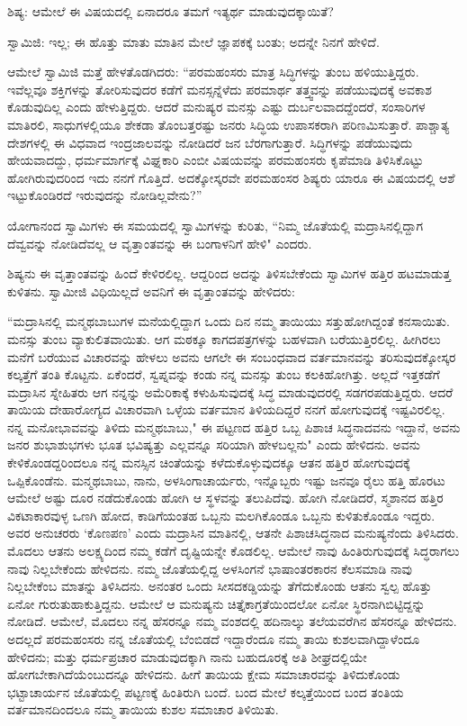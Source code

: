ಶಿಷ್ಯ: ಆಮೇಲೆ ಈ ವಿಷಯದಲ್ಲಿ ಏನಾದರೂ ತಮಗೆ ಇತ್ಯರ್ಥ ಮಾಡುವುದಕ್ಕಾಯಿತೆ?

ಸ್ವಾಮಿಜಿ: ಇಲ್ಲ; ಈ ಹೊತ್ತು ಮಾತು ಮಾತಿನ ಮೇಲೆ ಜ್ಞಾಪಕಕ್ಕೆ ಬಂತು; ಅದನ್ನೇ ನಿನಗೆ ಹೇಳಿದೆ.

ಆಮೇಲೆ ಸ್ವಾಮಿಜಿ ಮತ್ತೆ ಹೇಳತೊಡಗಿದರು: “ಪರಮಹಂಸರು ಮಾತ್ರ ಸಿದ್ಧಿಗಳನ್ನು ತುಂಬ ಹಳಿಯುತ್ತಿದ್ದರು. ಇವೆಲ್ಲವೂ ಶಕ್ತಿಗಳನ್ನು ತೋರಿಸುವುದರ ಕಡೆಗೆ ಮನಸ್ಸನ್ನೆಳೆದು ಪರಮಾರ್ಥ ತತ್ತ್ವವನ್ನು ಪಡೆಯುವುದಕ್ಕೆ ಅವಕಾಶ ಕೊಡುವುದಿಲ್ಲ ಎಂದು ಹೇಳುತ್ತಿದ್ದರು. ಆದರೆ ಮನುಷ್ಯರ ಮನಸ್ಸು ಎಷ್ಟು ದುರ್ಬಲವಾದದ್ದೆಂದರೆ, ಸಂಸಾರಿಗಳ ಮಾತಿರಲಿ, ಸಾಧುಗಳಲ್ಲಿಯೂ ಶೇಕಡಾ ತೊಂಬತ್ತರಷ್ಟು ಜನರು ಸಿದ್ಧಿಯ ಉಪಾಸಕರಾಗಿ ಪರಿಣಮಿಸುತ್ತಾರೆ. ಪಾಶ್ಚಾತ್ಯ ದೇಶಗಳಲ್ಲಿ ಈ ವಿಧವಾದ ಇಂದ್ರಜಾಲವನ್ನು ನೋಡಿದರೆ ಜನ ಬೆರಗಾಗುತ್ತಾರೆ. ಸಿದ್ಧಿಗಳನ್ನು ಪಡೆಯುವುದು ಹೇಯವಾದದ್ದು, ಧರ್ಮಮಾರ್ಗಕ್ಕೆ ವಿಘ್ನಕಾರಿ ಎಂಬೀ ವಿಷಯವನ್ನು ಪರಮಹಂಸರು ಕೃಪೆಮಾಡಿ ತಿಳಿಸಿಕೊಟ್ಟು ಹೋಗಿರುವುದರಿಂದ ಇದು ನನಗೆ ಗೊತ್ತಿದೆ. ಅದಕ್ಕೋಸ್ಕರವೇ ಪರಮಹಂಸರ ಶಿಷ್ಯರು ಯಾರೂ ಈ ವಿಷಯದಲ್ಲಿ ಆಶೆ ಇಟ್ಟುಕೊಂಡಿರದೆ ಇರುವುದನ್ನು ನೋಡಿಲ್ಲವೇನು?”

ಯೋಗಾನಂದ ಸ್ವಾಮಿಗಳು ಈ ಸಮಯದಲ್ಲಿ ಸ್ವಾಮಿಗಳನ್ನು ಕುರಿತು, “ನಿಮ್ಮ ಜೊತೆಯಲ್ಲಿ ಮದ್ರಾಸಿನಲ್ಲಿದ್ದಾಗ ದೆವ್ವವನ್ನು ನೋಡಿದೆವಲ್ಲ ಆ ವೃತ್ತಾಂತವನ್ನು ಈ ಬಂಗಾಳನಿಗೆ ಹೇಳಿ" ಎಂದರು.

ಶಿಷ್ಯನು ಈ ವೃತ್ತಾಂತವನ್ನು ಹಿಂದೆ ಕೇಳಿರಲಿಲ್ಲ. ಆದ್ದರಿಂದ ಅದನ್ನು ತಿಳಿಸಬೇಕೆಂದು ಸ್ವಾಮಿಗಳ ಹತ್ತಿರ ಹಟಮಾಡುತ್ತ ಕುಳಿತನು. ಸ್ವಾಮೀಜಿ ವಿಧಿಯಿಲ್ಲದೆ ಅವನಿಗೆ ಈ ವೃತ್ತಾಂತವನ್ನು ಹೇಳಿದರು:

“ಮದ್ರಾಸಿನಲ್ಲಿ ಮನ್ಮಥಬಾಬುಗಳ ಮನೆಯಲ್ಲಿದ್ದಾಗ ಒಂದು ದಿನ ನಮ್ಮ ತಾಯಿಯು ಸತ್ತುಹೋಗಿದ್ದಂತೆ ಕನಸಾಯಿತು. ಮನಸ್ಸು ತುಂಬ ವ್ಯಾಕುಲಿತವಾಯಿತು. ಆಗ ಮಠಕ್ಕೂ ಕಾಗದಪತ್ರಗಳನ್ನು ಬಹಳವಾಗಿ ಬರೆಯುತ್ತಿರಲಿಲ್ಲ. ಹೀಗಿರಲು ಮನೆಗೆ ಬರೆಯುವ ವಿಚಾರವನ್ನು ಹೇಳಲು ಅವನು ಆಗಲೇ ಈ ಸಂಬಂಧವಾದ ವರ್ತಮಾನವನ್ನು ತರಿಸುವುದಕ್ಕೋಸ್ಕರ ಕಲ್ಕತ್ತೆಗೆ ತಂತಿ ಕೊಟ್ಟನು. ಏಕೆಂದರೆ, ಸ್ವಪ್ನವನ್ನು ಕಂಡು ನನ್ನ ಮನಸ್ಸು ತುಂಬ ಕಲಕಿಹೋಗಿತ್ತು. ಅಲ್ಲದೆ ಇತ್ತಕಡೆಗೆ ಮದ್ರಾಸಿನ ಸ್ನೇಹಿತರು ಆಗ ನನ್ನನ್ನು ಅಮೆರಿಕಾಕ್ಕೆ ಕಳುಹಿಸುವುದಕ್ಕೆ ಸಿದ್ಧ ಮಾಡುವುದರಲ್ಲಿ ಸಡಗರಪಡುತ್ತಿದ್ದರು. ಆದರೆ ತಾಯಿಯ ದೇಹಾರೋಗ್ಯದ ವಿಚಾರವಾಗಿ ಒಳ್ಳೆಯ ವರ್ತಮಾನ ತಿಳಿಯದಿದ್ದರೆ ನನಗೆ ಹೋಗುವುದಕ್ಕೆ ಇಷ್ಟವಿರಲಿಲ್ಲ. ನನ್ನ ಮನೋಭಾವವನ್ನು ತಿಳಿದು ಮನ್ಮಥಬಾಬು," ಈ ಪಟ್ಟಣದ ಹತ್ತಿರ ಒಬ್ಬ ಪಿಶಾಚ ಸಿದ್ಧನಾದವನು ಇದ್ದಾನೆ, ಅವನು ಜನರ ಶುಭಾಶುಭಗಳು ಭೂತ ಭವಿಷ್ಯತ್ತು ಎಲ್ಲವನ್ನೂ ಸರಿಯಾಗಿ ಹೇಳಬಲ್ಲನು" ಎಂದು ಹೇಳಿದನು. ಅವನು ಕೇಳಿಕೊಂಡದ್ದರಿಂದಲೂ ನನ್ನ ಮನಸ್ಸಿನ ಚಿಂತೆಯನ್ನು ಕಳೆದುಕೊಳ್ಳುವುದಕ್ಕೂ ಆತನ ಹತ್ತಿರ ಹೋಗುವುದಕ್ಕೆ ಒಪ್ಪಿಕೊಂಡೆನು. ಮನ್ಮಥಬಾಬು, ನಾನು, ಅಳಸಿಂಗಾಚಾರ್ಯರು, ಇನ್ನೊಬ್ಬರು ಇಷ್ಟು ಜನವೂ ರೈಲು ಹತ್ತಿ ಹೊರಟು ಆಮೇಲೆ ಅಷ್ಟು ದೂರ ನಡೆದುಕೊಂಡು ಹೋಗಿ ಆ ಸ್ಥಳವನ್ನು ತಲುಪಿದೆವು. ಹೋಗಿ ನೋಡಿದರೆ, ಸ್ಮಶಾನದ ಹತ್ತಿರ ವಿಕಟಾಕಾರವುಳ್ಳ ಒಣಗಿ ಹೋದ, ಕಾಡಿಗೆಯಂತಹ ಒಬ್ಬನು ಮಲಗಿಕೊಂಡೂ ಒಬ್ಬನು ಕುಳಿತುಕೊಂಡೂ ಇದ್ದರು. ಅವರ ಅನುಚರರು ‘ಕೊಣಪಣ’ ಎಂದು ಮದ್ರಾಸಿನ ಮಾತಿನಲ್ಲಿ, ಆತನೇ ಪಿಶಾಚಸಿದ್ಧನಾದ ಮನುಷ್ಯನೆಂದು ತಿಳಿಸಿದರು. ಮೊದಲು ಆತನು ಅಲಕ್ಷ್ಯದಿಂದ ನಮ್ಮ ಕಡೆಗೆ ದೃಷ್ಟಿಯನ್ನೇ ಕೊಡಲಿಲ್ಲ. ಆಮೇಲೆ ನಾವು ಹಿಂತಿರುಗುವುದಕ್ಕೆ ಸಿದ್ಧರಾಗಲು ನಾವು ನಿಲ್ಲಬೇಕೆಂದು ಹೇಳಿದನು. ನಮ್ಮ ಜೊತೆಯಲ್ಲಿದ್ದ ಅಳಸಿಂಗನೆ ಭಾಷಾಂತರಕಾರನ ಕೆಲಸಮಾಡಿ ನಾವು ನಿಲ್ಲಬೇಕೆಂಬ ಮಾತನ್ನು ತಿಳಿಸಿದನು. ಅನಂತರ ಒಂದು ಸೀಸದಕಡ್ಡಿಯನ್ನು ತೆಗೆದುಕೊಂಡು ಆತನು ಸ್ವಲ್ಪ ಹೊತ್ತು ಏನೋ ಗುರುತುಹಾಕುತ್ತಿದ್ದನು. ಆಮೇಲೆ ಆ ಮನುಷ್ಯನು ಚಿತ್ತೈಕಾಗ್ರತೆಯಿಂದಲೋ ಏನೋ ಸ್ಥಿರನಾಗಿಬಿಟ್ಟಿದ್ದನ್ನು ನೋಡಿದೆ. ಆಮೇಲೆ, ಮೊದಲು ನನ್ನ ಹೆಸರನ್ನೂ ನಮ್ಮ ವಂಶದಲ್ಲಿ ಹದಿನಾಲ್ಕು ತಲೆಯವರೆಗಿನ ಹೆಸರನ್ನೂ ಹೇಳಿದನು. ಅದಲ್ಲದೆ ಪರಮಹಂಸರು ನನ್ನ ಜೊತೆಯಲ್ಲಿ ಬೆಂಬಿಡದೆ ಇದ್ದಾರೆಂದೂ ನಮ್ಮ ತಾಯಿ ಕುಶಲವಾಗಿದ್ದಾಳೆಂದೂ ಹೇಳಿದನು; ಮತ್ತು ಧರ್ಮಪ್ರಚಾರ ಮಾಡುವುದಕ್ಕಾಗಿ ನಾನು ಬಹುದೂರಕ್ಕೆ ಅತಿ ಶೀಘ್ರದಲ್ಲಿಯೇ ಹೋಗಬೇಕಾಗಿದೆಯೆಂಬುದನ್ನೂ ಹೇಳಿದನು. ಹೀಗೆ ತಾಯಿಯ ಕ್ಷೇಮ ಸಮಾಚಾರವನ್ನು ತಿಳಿದುಕೊಂಡು ಭಟ್ಟಾಚಾರ್ಯನ ಜೊತೆಯಲ್ಲಿ ಪಟ್ಟಣಕ್ಕೆ ಹಿಂತಿರುಗಿ ಬಂದೆ. ಬಂದ ಮೇಲೆ ಕಲ್ಕತ್ತೆಯಿಂದ ಬಂದ ತಂತಿಯ ವರ್ತಮಾನದಿಂದಲೂ ನಮ್ಮ ತಾಯಿಯ ಕುಶಲ ಸಮಾಚಾರ ತಿಳಿಯಿತು.


